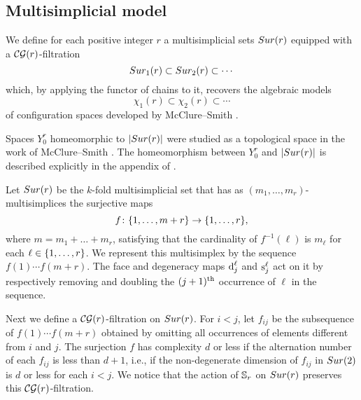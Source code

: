 \subsection{Multisimplicial model}\label{ss:surjection model}

We define for each positive integer $r$ a multisimplicial sets $Sur(r)$ equipped with a $\mathcal{CG}(r)$-filtration
\[
Sur_{1}(r) \subset Sur_{2}(r) \subset \dotsb
\]
which, by applying the functor of chains to it, recovers the algebraic models
\[
\chi_1(r) \subset \chi_2(r) \subset \dotsb
\]
of configuration spaces developed by McClure--Smith \cite{mcluresmith2004geomodel}.

Spaces $Y_0^r$ homeomorphic to $\lvert Sur(r)\rvert$ were studied as a topological space in the work of McClure--Smith \cite{mcclure2003multivariable}.
The homeomorphism between $Y_0^r$ and $\lvert Sur(r)\rvert$ is described explicitly in the appendix of \cite{salvatore2009deligne}.

Let $Sur(r)$ be the $k$-fold multisimplicial set that has as $(m_1,\dots,m_r)$-multisimplices the surjective maps
\[
f \colon \{1,\dots,m+r\} \to \{1,\dots,r\},
\]
where $m = m_1+\dots+m_r$, satisfying that the cardinality of $f^{-1}(\ell)$ is $m_\ell$ for each $\ell \in \{1,\dots,r\}$.
We represent this multisimplex by the sequence $f(1) \dotsm f(m+r)$.
The face and degeneracy maps $\operatorname{d}^\ell_j$ and $\operatorname{s}^\ell_j$ act on it by respectively removing and doubling the $(j+1)^{\mathrm{th}}$ occurrence of $\ell$ in the sequence.

Next we define a $\mathcal{CG}(r)$-filtration on $Sur(r)$.
For $i<j$, let $f_{ij}$ be the subsequence of $f(1) \dotsm f(m+r)$ obtained by omitting all occurrences of elements different from $i$ and $j$.
The surjection $f$ has complexity $d$ or less if
the alternation number of each $f_{ij}$ is less than $d+1$, i.e., if the non-degenerate dimension of $f_{ij}$ in $Sur(2)$ is $d$ or less for each $i<j$.
We notice that the action of $\mathbb{S}_r$ on $Sur(r)$ preserves this $\mathcal{CG}(r)$-filtration.

